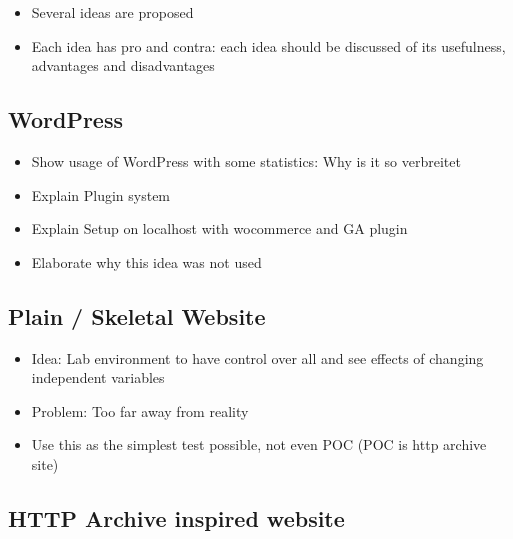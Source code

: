 \begin{itemize}
\item Several ideas are proposed
\item Each idea has pro and contra: each idea should be discussed of its usefulness, advantages and disadvantages
\end{itemize}





\subsection{WordPress}

\begin{itemize}
    \item Show usage of WordPress with some statistics: Why is it so verbreitet
    \item Explain Plugin system
    \item Explain Setup on localhost with wocommerce and GA plugin
    \item Elaborate why this idea was not used
\end{itemize}







\subsection{Plain / Skeletal Website}

\begin{itemize}
    \item Idea: Lab environment to have control over all and see effects of changing independent variables
    \item Problem: Too far away from reality
    \item Use this as the simplest test possible, not even POC (POC is http archive site)
\end{itemize}







\subsection{HTTP Archive inspired website}

